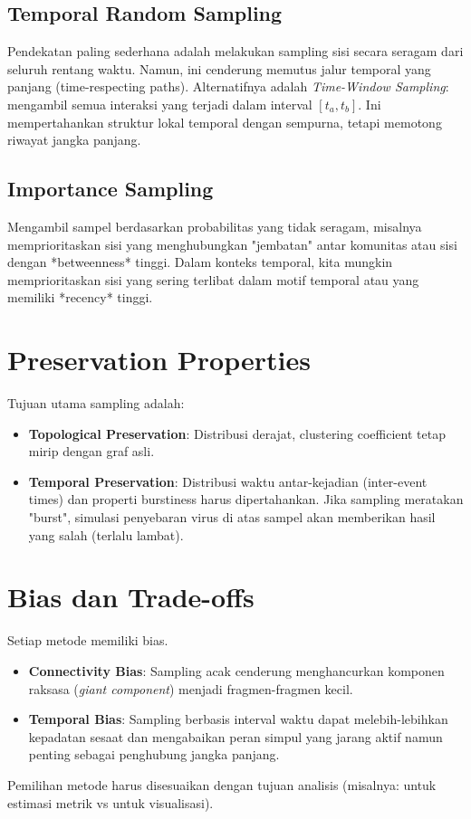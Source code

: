\documentclass[12pt,a4paper]{book}
\begin{document}
\subsection{Temporal Random Sampling}
Pendekatan paling sederhana adalah melakukan sampling sisi secara seragam dari seluruh rentang waktu. Namun, ini cenderung memutus jalur temporal yang panjang (time-respecting paths).
Alternatifnya adalah \textit{Time-Window Sampling}: mengambil semua interaksi yang terjadi dalam interval $[t_a, t_b]$. Ini mempertahankan struktur lokal temporal dengan sempurna, tetapi memotong riwayat jangka panjang.

\subsection{Importance Sampling}
Mengambil sampel berdasarkan probabilitas yang tidak seragam, misalnya memprioritaskan sisi yang menghubungkan "jembatan" antar komunitas atau sisi dengan *betweenness* tinggi. Dalam konteks temporal, kita mungkin memprioritaskan sisi yang sering terlibat dalam motif temporal atau yang memiliki *recency* tinggi.

\section{Preservation Properties}
Tujuan utama sampling adalah:
\begin{itemize}
    \item \textbf{Topological Preservation}: Distribusi derajat, clustering coefficient tetap mirip dengan graf asli.
    \item \textbf{Temporal Preservation}: Distribusi waktu antar-kejadian (inter-event times) dan properti burstiness harus dipertahankan. Jika sampling meratakan "burst", simulasi penyebaran virus di atas sampel akan memberikan hasil yang salah (terlalu lambat).
\end{itemize}

\section{Bias dan Trade-offs}
Setiap metode memiliki bias.
\begin{itemize}
    \item \textbf{Connectivity Bias}: Sampling acak cenderung menghancurkan komponen raksasa (\textit{giant component}) menjadi fragmen-fragmen kecil.
    \item \textbf{Temporal Bias}: Sampling berbasis interval waktu dapat melebih-lebihkan kepadatan sesaat dan mengabaikan peran simpul yang jarang aktif namun penting sebagai penghubung jangka panjang.
\end{itemize}
Pemilihan metode harus disesuaikan dengan tujuan analisis (misalnya: untuk estimasi metrik vs untuk visualisasi).
\end{document}
